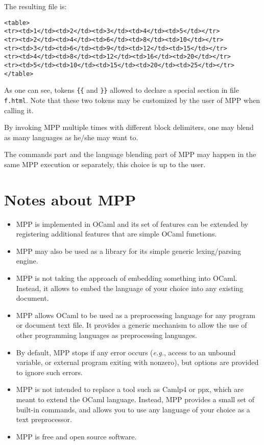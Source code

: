 \documentclass[a4paper]{article}
\def\eg{\emph{e.g.}}
\begin{document}
The resulting file is:
\begin{lstlisting}
<table>
<tr><td>1</td><td>2</td><td>3</td><td>4</td><td>5</td></tr>
<tr><td>2</td><td>4</td><td>6</td><td>8</td><td>10</td></tr>
<tr><td>3</td><td>6</td><td>9</td><td>12</td><td>15</td></tr>
<tr><td>4</td><td>8</td><td>12</td><td>16</td><td>20</td></tr>
<tr><td>5</td><td>10</td><td>15</td><td>20</td><td>25</td></tr>
</table>
\end{lstlisting}

As one  can see, tokens \verb+{{+  and \verb+}}+ allowed  to declare a
special section  in file \texttt{f.html}.  Note that  these two tokens
may be customized by the user of MPP when calling it.

By invoking MPP multiple times with different block delimiters, one
may blend as many languages as he/she may want to.

The commands part and the language  blending part of MPP may happen in
the same MPP execution or separately, this choice is up to the user.



\section{Notes about MPP}
\begin{itemize}
\item MPP is implemented in OCaml and its set of features can be
  extended by registering additional features that are simple OCaml
  functions.

\item MPP may also be used as a library for its simple generic
  lexing/parsing engine.


\item MPP is not taking the approach of embedding something into
  OCaml. Instead, it allows to embed the language of your choice into
  any existing document.


\item MPP allows OCaml to be used as a preprocessing language for any
  program or document text file.  It provides a generic mechanism to
  allow the use of other programming languages as preprocessing
  languages.

\item By  default, MPP stops  if any error  occurs (\eg, access  to an
  unbound  variable, or  external program  exiting with  nonzero), but
  options are provided to ignore such errors.

\item MPP is not intended to replace a tool such as Camlp4 or ppx,
  which are meant to extend the OCaml language. Instead, MPP provides
  a small set of built-in commands, and allows you to use any language
  of your choice as a text preprocessor.

\item MPP is free and open source software.
\end{itemize}
\end{document}
